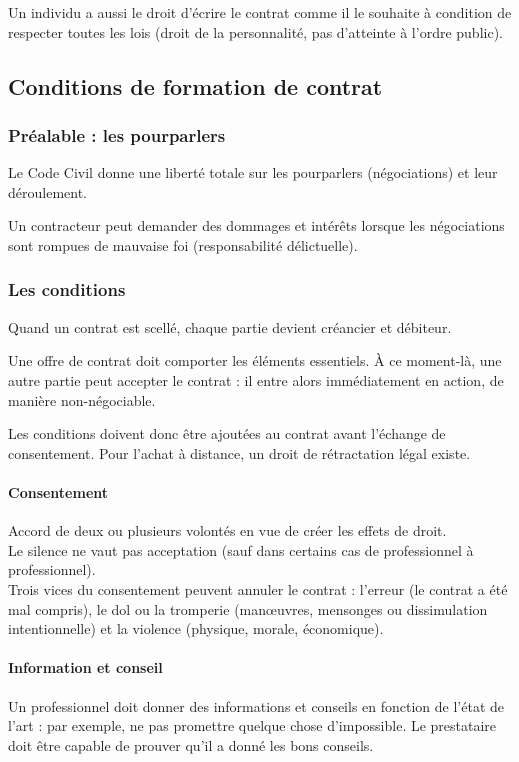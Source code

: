 \documentclass[10pt,a4paper,french]{article}
\begin{document}
Un individu a aussi le droit d'écrire le contrat comme il le souhaite à condition de respecter toutes les lois (droit de la personnalité, pas d'atteinte à l'ordre public).

\subsection{Conditions de formation de contrat}

\subsubsection{Préalable : les pourparlers}
Le Code Civil donne une liberté totale sur les pourparlers (négociations) et leur déroulement.

Un contracteur peut demander des dommages et intérêts lorsque les négociations sont rompues de mauvaise foi (responsabilité délictuelle).

\subsubsection{Les conditions}

Quand un contrat est scellé, chaque partie devient créancier et débiteur.

Une offre de contrat doit comporter les éléments essentiels. À ce moment-là, une autre partie peut accepter le contrat : il entre alors immédiatement en action, de manière non-négociable.

Les conditions doivent donc être ajoutées au contrat avant l'échange de consentement. Pour l'achat à distance, un droit de rétractation légal existe.

\paragraph{Consentement}
Accord de deux ou plusieurs volontés en vue de créer les effets de droit. \\
Le silence ne vaut pas acceptation (sauf dans certains cas de professionnel à professionnel). \\
Trois vices du consentement peuvent annuler le contrat : l'erreur (le contrat a été mal compris), le dol ou la tromperie (manœuvres, mensonges ou dissimulation intentionnelle) et la violence (physique, morale, économique).

\paragraph{Information et conseil}
Un professionnel doit donner des informations et conseils en fonction de l'état de l'art : par exemple, ne pas promettre quelque chose d'impossible. Le prestataire doit être capable de prouver qu'il a donné les bons conseils.
\end{document}
